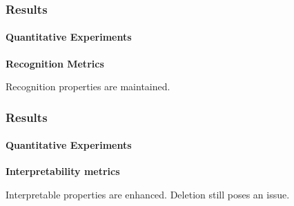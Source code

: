 \begin{frame}[t]
    \frametitle{Results}
    \framesubtitle{Quantitative Experiments}
    \small \textbf{Recognition Metrics}
    \footnotesize
    \begin{center}
            
    \end{center}\pause
    Recognition properties are maintained.

\end{frame}
\begin{frame}[t]
    \frametitle{Results}
    \framesubtitle{Quantitative Experiments}
    \small \textbf{Interpretability metrics}
    \footnotesize
    \begin{center}
            
    \end{center}
    \pause
    Interpretable properties are enhanced. Deletion still poses an issue.
\end{frame}